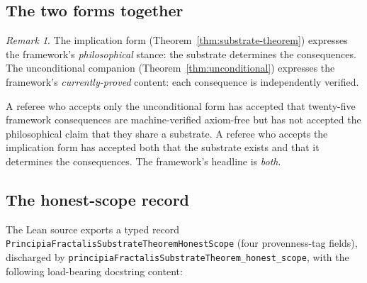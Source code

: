 \documentclass[11pt,a4paper]{article}
\theoremstyle{definition}
\theoremstyle{remark}
\newtheorem{remark}[theorem]{Remark}
\newcommand{\lean}[1]{\texttt{\small #1}}
\begin{document}
\subsection{The two forms together}

\begin{remark}\label{rem:two-forms}
The implication form (Theorem~\ref{thm:substrate-theorem}) expresses
the framework's \emph{philosophical} stance: the substrate determines
the consequences. The unconditional companion
(Theorem~\ref{thm:unconditional}) expresses the framework's
\emph{currently-proved} content: each consequence is independently
verified.

A referee who accepts only the unconditional form has accepted that
twenty-five framework consequences are machine-verified axiom-free
but has not accepted the philosophical claim that they share a
substrate. A referee who accepts the implication form has accepted
both that the substrate exists and that it determines the
consequences. The framework's headline is \emph{both}.
\end{remark}

\subsection{The honest-scope record}

The Lean source exports a typed record
\lean{PrincipiaFractalisSubstrateTheoremHonestScope} (four
provenness-tag fields), discharged by
\lean{principiaFractalisSubstrateTheorem\_honest\_scope}, with the
following load-bearing docstring content:
\end{document}
